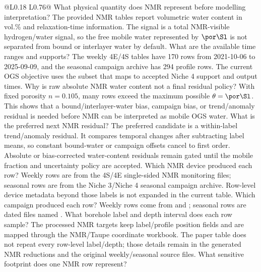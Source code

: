 \begin{longtable}{@{}L{0.18\textwidth} L{0.76\textwidth}@{}}
\toprule
{}
{ What physical quantity does NMR represent before modelling interpretation?}
{The provided NMR tables report volumetric water content in vol.\% and relaxation-time
information.  The signal is a total NMR-visible hydrogen/water signal, so the free
mobile water represented by \(\por\Sl\) is not separated from bound or interlayer
water by default.}
{ What are the available time ranges and supports?}
{The weekly 4E/4S tables have 170 rows from 2021-10-06 to 2025-09-09, and the
seasonal campaign archive has 294 profile rows.  The current OGS objective uses
the subset that maps to accepted Niche 4 support and output times.}
{ Why is raw absolute NMR water content not a final residual policy?}
{With fixed porosity \(n=0.105\), many rows exceed the maximum possible
\(\theta=\por\Sl\).  This shows that a bound/interlayer-water bias, campaign bias,
or trend/anomaly residual is needed before NMR can be interpreted as mobile OGS
water.}
{ What is the preferred next NMR residual?}
{The preferred candidate is a within-label trend/anomaly residual.  It compares
temporal changes after subtracting label means, so constant bound-water or campaign
offsets cancel to first order.  Absolute or bias-corrected water-content residuals
remain gated until the mobile fraction and uncertainty policy are accepted.}
{ Which NMR device produced each row?}
{Weekly rows are from the 4S/4E single-sided NMR monitoring files; seasonal rows are
from the Niche 3/Niche 4 seasonal campaign archive.  Row-level device metadata beyond
those labels is not expanded in the current table.}
{ Which campaign produced each row?}
{Weekly rows come from  and
; seasonal rows are dated files named
.}
{ What borehole label and depth interval does each row sample?}
{The processed NMR targets keep label/profile position fields and are mapped through
the NMR/Taupe coordinate workbook.  The paper table does not repeat every row-level
label/depth; those details remain in the generated NMR reductions and the original
weekly/seasonal source files.}
{ What sensitive footprint does one NMR row represent?}

\end{longtable}
